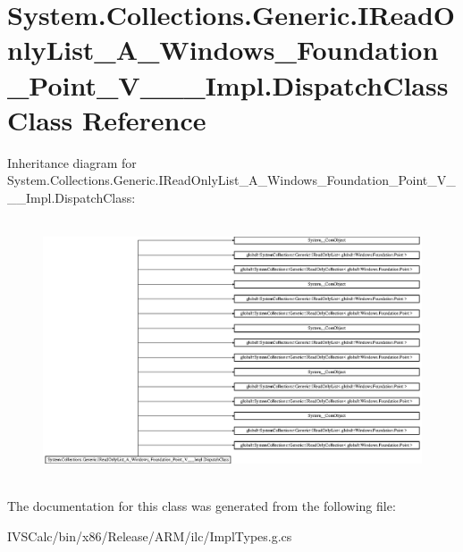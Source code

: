 \hypertarget{class_system_1_1_collections_1_1_generic_1_1_i_read_only_list___a___windows___foundation___point1b9e2c3bd882dc30c22a0a2c470477e8}{}\section{System.\+Collections.\+Generic.\+I\+Read\+Only\+List\+\_\+\+A\+\_\+\+Windows\+\_\+\+Foundation\+\_\+\+Point\+\_\+\+V\+\_\+\+\_\+\+\_\+\+Impl.\+Dispatch\+Class Class Reference}
\label{class_system_1_1_collections_1_1_generic_1_1_i_read_only_list___a___windows___foundation___point1b9e2c3bd882dc30c22a0a2c470477e8}
Inheritance diagram for System.\+Collections.\+Generic.\+I\+Read\+Only\+List\+\_\+\+A\+\_\+\+Windows\+\_\+\+Foundation\+\_\+\+Point\+\_\+\+V\+\_\+\+\_\+\+\_\+\+Impl.\+Dispatch\+Class\+:\begin{figure}[H]
\begin{center}
\leavevmode
\includegraphics[height=7.750865cm]{class_system_1_1_collections_1_1_generic_1_1_i_read_only_list___a___windows___foundation___point1b9e2c3bd882dc30c22a0a2c470477e8}
\end{center}
\end{figure}


The documentation for this class was generated from the following file\+:\begin{DoxyCompactItemize}
\item 
I\+V\+S\+Calc/bin/x86/\+Release/\+A\+R\+M/ilc/Impl\+Types.\+g.\+cs\end{DoxyCompactItemize}
